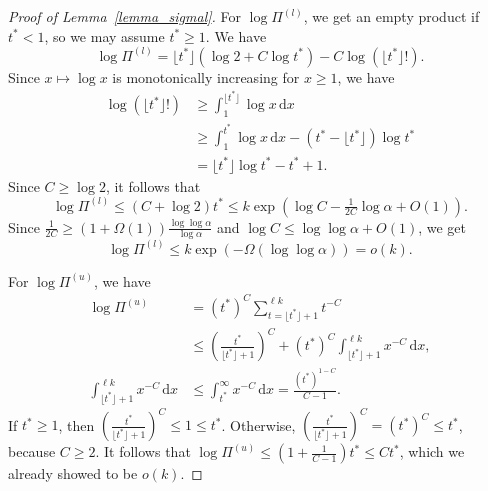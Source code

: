 \documentclass{article}
\theoremstyle{plain}
\theoremstyle{remark}
\theoremstyle{plain}
\numberwithin{equation}{section}
\begin{document}
\begin{proof}[Proof of Lemma~\ref{lemma_sigmal}]
		For $\log\Pi^{(l)}$, we get an empty product if $t^*<1$, so we may assume $t^*\geq1$. We have $$\log\Pi^{(l)}=\lfloor t^*\rfloor(\log2+C\log t^*)-C\log(\lfloor t^*\rfloor!).$$ Since $x\mapsto\log x$ is monotonically increasing for $x\geq1$, we have
		\begin{align}
			\log(\lfloor t^*\rfloor!)
			&\geq\int_1^{\lfloor t^*\rfloor}\log x\,\mathrm{d}x
			\\&\geq\int_1^{t^*}\log x\,\mathrm{d}x-(t^*-\lfloor t^*\rfloor)\log t^*
			\\&=\lfloor t^*\rfloor\log t^*-t^*+1.
		\end{align}
		Since $C\geq\log2$, it follows that $$\log\Pi^{(l)}\leq(C+\log2)t^*\leq k\exp(\log C-\tfrac1{2C}\log\alpha+O(1)).$$ Since $\frac1{2C}\geq(1+\Omega(1))\frac{\log\log\alpha}{\log\alpha}$ and $\log C\leq\log\log\alpha+O(1)$, we get $$\log\Pi^{(l)}\leq k\exp(-\Omega(\log\log\alpha))=o(k).$$
		
		For $\log\Pi^{(u)}$, we have
		\begin{align}
			\log\Pi^{(u)}
			&=(t^*)^C\sum_{t=\lfloor t^*\rfloor+1}^{\ell k}t^{-C}
			\\&\leq\left(\frac{t^*}{\lfloor t^*\rfloor+1}\right)^{C}+(t^*)^C\int_{\lfloor t^*\rfloor+1}^{\ell k}x^{-C}\,\mathrm{d}x,
			\\\int_{\lfloor t^*\rfloor+1}^{\ell k}x^{-C}\,\mathrm{d}x
			&\leq\int_{t^*}^{\infty}x^{-C}\,\mathrm{d}x=\frac{(t^*)^{1-C}}{C-1}.
		\end{align}
		If $t^*\geq1$, then $(\frac{t^*}{\lfloor t^*\rfloor+1})^C\leq1\leq t^*$. Otherwise, $(\frac{t^*}{\lfloor t^*\rfloor+1})^C=(t^*)^C\leq t^*$, because $C\geq2$. It follows that $\log\Pi^{(u)}\leq(1+\tfrac1{C-1})t^*\leq Ct^*$, which we already showed to be $o(k)$.
	\end{proof}
	
\end{document}
